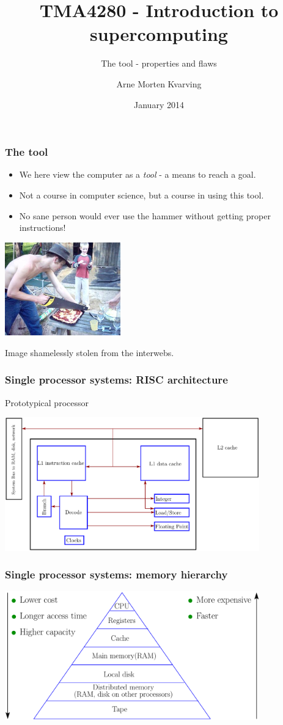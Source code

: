 \documentclass{beamer}
\title{TMA4280 - Introduction to supercomputing}
\subtitle{The tool - properties and flaws}
\author{Arne Morten Kvarving}
\institute{NTNU and SINTEF ICT}
\date{January 2014}
\begin{document}
\maketitle


\begin{frame}\frametitle{The tool}
  \begin{itemize}
    \item We here view the computer as a \emph{tool} - a means to reach a goal.
    \item Not a course in computer science, but a course in using this tool.
    \item No sane person would ever use the hammer without getting proper instructions!
  \end{itemize}
  \begin{center}
    \includegraphics[width=5cm]{wrong-tool-pizza}
  \end{center}
  Image shamelessly stolen from the interwebs.
\end{frame}

\begin{frame}\frametitle{Single processor systems: RISC architecture}
Prototypical processor
\begin{center}
  \includegraphics[width=11cm]{../../notes/01.single/Lande}
\end{center}
\end{frame}

\begin{frame}\frametitle{Single processor systems: memory hierarchy}
  \begin{center}
    \includegraphics[width=11cm]{../../notes/01.single/MemoryHierarchy}
  \end{center}
\end{frame}
\end{document}
